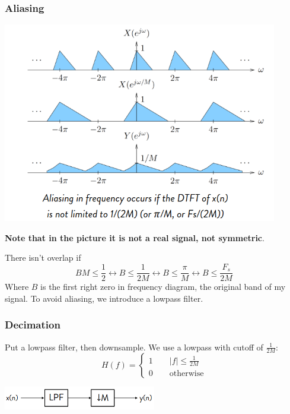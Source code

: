     \subsubsection{Aliasing}
    \begin{center}
        \includegraphics[width=0.9\textwidth]{images/downsampling_aliasing.png}
    \end{center}
    \textbf{Note that in the picture it is not a real signal, not symmetric}.

    There isn't overlap if
    $$
    BM\leq \frac{1}{2}\leftrightarrow B\leq\frac{1}{2M}\leftrightarrow B\leq\frac{\pi}{M}\leftrightarrow B\leq\frac{F_s}{2M}
    $$
    Where $B$ is the first right zero in frequency diagram, the original band of my signal. To avoid aliasing, we introduce a lowpass filter.

    \subsubsection{Decimation}
    Put a lowpass filter, then downsample. We use a lowpass with cutoff of $\frac{1}{2M}$:
    $$
    H(f)=\begin{cases}
        1\qquad |f|\leq\frac{1}{2M}\\
        0\qquad\text{otherwise}
    \end{cases}
    $$
    \begin{center}
        \includegraphics[width=0.5\textwidth]{images/downsampling_lpf.png}
    \end{center}

